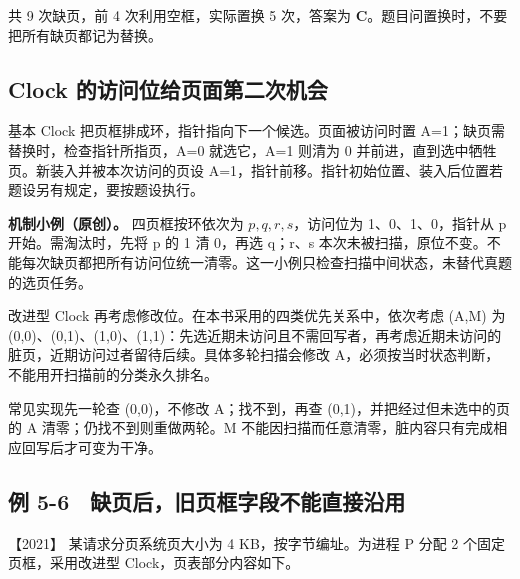 共 9 次缺页，前 4 次利用空框，实际置换 5 次，答案为 \textbf{C}。题目问置换时，不要把所有缺页都记为替换。

\subsection{Clock 的访问位给页面第二次机会}\label{os-c05-h182}

基本 Clock 把页框排成环，指针指向下一个候选。页面被访问时置 A=1；缺页需替换时，检查指针所指页，A=0 就选它，A=1 则清为 0 并前进，直到选中牺牲页。新装入并被本次访问的页设 A=1，指针前移。指针初始位置、装入后位置若题设另有规定，要按题设执行。

\textbf{机制小例（原创）。} 四页框按环依次为 \(p,q,r,s\)，访问位为 1、0、1、0，指针从 p 开始。需淘汰时，先将 p 的 1 清 0，再选 q；r、s 本次未被扫描，原位不变。不能每次缺页都把所有访问位统一清零。这一小例只检查扫描中间状态，未替代真题的选页任务。

改进型 Clock 再考虑修改位。在本书采用的四类优先关系中，依次考虑 (A,M) 为 (0,0)、(0,1)、(1,0)、(1,1)：先选近期未访问且不需回写者，再考虑近期未访问的脏页，近期访问过者留待后续。具体多轮扫描会修改 A，必须按当时状态判断，不能用开扫描前的分类永久排名。

常见实现先一轮查 (0,0)，不修改 A；找不到，再查 (0,1)，并把经过但未选中的页的 A 清零；仍找不到则重做两轮。M 不能因扫描而任意清零，脏内容只有完成相应回写后才可变为干净。

\subsection{例 5-6　缺页后，旧页框字段不能直接沿用}\label{os-ex5-6}

\noindent{}【2021】 某请求分页系统页大小为 4 KB，按字节编址。为进程 P 分配 2 个固定页框，采用改进型 Clock，页表部分内容如下。

